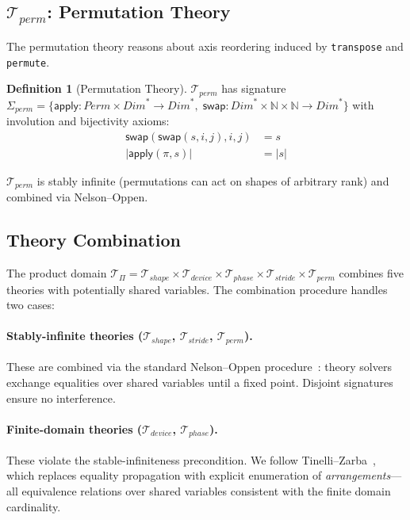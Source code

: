 \documentclass[10pt]{article}
\newcommand{\Tshape}{\mathcal{T}_{\mathit{shape}}}
\newcommand{\Tdevice}{\mathcal{T}_{\mathit{device}}}
\newcommand{\Tphase}{\mathcal{T}_{\mathit{phase}}}
\newcommand{\Tstride}{\mathcal{T}_{\mathit{stride}}}
\newcommand{\Tperm}{\mathcal{T}_{\mathit{perm}}}
\newcommand{\Tprod}{\mathcal{T}_{\Pi}}
\theoremstyle{plain}
\theoremstyle{definition}
\newtheorem{definition}[theorem]{Definition}
\theoremstyle{remark}
\begin{document}
\subsection{$\Tperm$: Permutation Theory}\label{sec:tperm}

The permutation theory reasons about axis reordering induced by
\texttt{transpose} and \texttt{permute}.

\begin{definition}[Permutation Theory]
$\Tperm$ has signature
$\Sigma_{\mathit{perm}} = \{
  \mathsf{apply} : \mathit{Perm} \times \mathit{Dim}^* \to
    \mathit{Dim}^*,\;
  \mathsf{swap} : \mathit{Dim}^* \times \mathbb{N} \times
    \mathbb{N} \to \mathit{Dim}^*
\}$
with involution and bijectivity axioms:
\begin{align}
  \mathsf{swap}(\mathsf{swap}(s, i, j), i, j) &= s
    \label{ax:involution} \\
  |\mathsf{apply}(\pi, s)| &= |s|
    \label{ax:bijectivity}
\end{align}
\end{definition}

$\Tperm$ is stably infinite (permutations can act on shapes of
arbitrary rank) and combined via Nelson--Oppen.


\subsection{Theory Combination}\label{sec:combination}

The product domain $\Tprod = \Tshape \times \Tdevice \times \Tphase
\times \Tstride \times \Tperm$ combines five theories with
potentially shared variables.  The combination procedure handles two
cases:

\paragraph{Stably-infinite theories ($\Tshape$, $\Tstride$, $\Tperm$).}
These are combined via the standard Nelson--Oppen
procedure~\cite{nelsonoppen79}: theory solvers exchange equalities
over shared variables until a fixed point.  Disjoint signatures
ensure no interference.

\paragraph{Finite-domain theories ($\Tdevice$, $\Tphase$).}
These violate the stable-infiniteness precondition.  We follow
Tinelli--Zarba~\cite{tinelli03}, which replaces equality propagation
with explicit enumeration of \emph{arrangements}---all equivalence
relations over shared variables consistent with the finite domain
cardinality.
\end{document}
